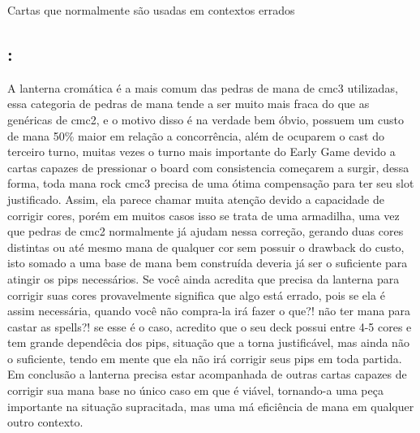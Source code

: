 Cartas que normalmente são usadas em contextos errados



\subsection{:} A lanterna cromática é a mais comum das pedras de mana de cmc3 utilizadas, essa categoria de pedras de mana tende a ser muito mais fraca do que as genéricas de cmc2, e o motivo disso é na verdade bem óbvio, possuem um custo de mana 50\% maior em relação a concorrência, além de ocuparem o cast do terceiro turno, muitas vezes o turno mais importante do Early Game devido a cartas capazes de pressionar o board com consistencia começarem a surgir, dessa forma, toda mana rock cmc3 precisa de uma ótima compensação para ter seu slot justificado.
Assim, ela parece chamar muita atenção devido a capacidade de corrigir cores, porém em muitos casos isso se trata de uma armadilha, uma vez que pedras de cmc2 normalmente já ajudam nessa correção, gerando duas cores distintas ou até mesmo mana de qualquer cor sem possuir o drawback do custo, isto somado a uma base de mana bem construída deveria já ser o suficiente para atingir os pips necessários. 
Se você ainda acredita que precisa da lanterna para corrigir suas cores provavelmente significa que algo está errado, pois se ela é assim necessária, quando você não compra-la irá fazer o que?! não ter mana para castar as spells?! se esse é o caso, acredito que o seu deck possui entre 4-5 cores e tem grande dependêcia dos pips, situação que a torna justificável, mas ainda não o suficiente, tendo em mente que ela não irá corrigir seus pips em toda partida. 
Em conclusão a lanterna precisa estar acompanhada de outras cartas capazes de corrigir sua mana base no único caso em que é viável, tornando-a uma peça importante na situação supracitada, mas uma má eficiência de mana em qualquer outro contexto.

